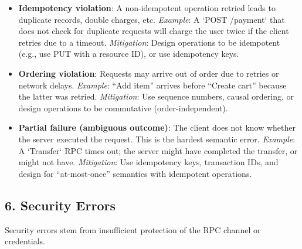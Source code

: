 \documentclass[10pt,a4paper]{article}
\begin{document}
\begin{itemize}
    \item \textbf{Idempotency violation}: A non-idempotent operation retried leads to duplicate records, double charges, etc.  
        \textit{Example}: A `POST /payment` that does not check for duplicate requests will charge the user twice if the client retries due to a timeout.  
        \textit{Mitigation}: Design operations to be idempotent (e.g., use PUT with a resource ID), or use idempotency keys.
    
    \item \textbf{Ordering violation}: Requests may arrive out of order due to retries or network delays.  
        \textit{Example}: “Add item” arrives before “Create cart” because the latter was retried.  
        \textit{Mitigation}: Use sequence numbers, causal ordering, or design operations to be commutative (order-independent).
    
    \item \textbf{Partial failure (ambiguous outcome)}: The client does not know whether the server executed the request. This is the hardest semantic error.  
        \textit{Example}: A `Transfer` RPC times out; the server might have completed the transfer, or might not have.  
        \textit{Mitigation}: Use idempotency keys, transaction IDs, and design for “at-most-once” semantics with idempotent operations.
\end{itemize}

\subsection{6. Security Errors}
Security errors stem from insufficient protection of the RPC channel or credentials.
\end{document}
